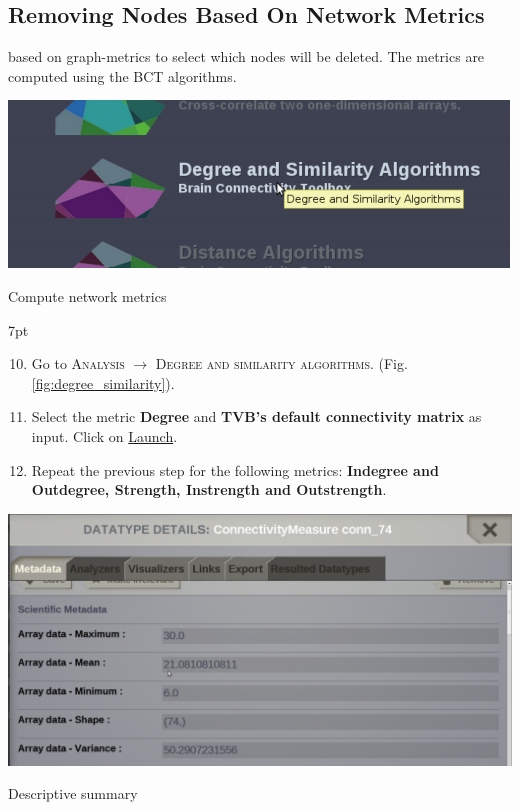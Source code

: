 \documentclass{tufte-handout}
\newenvironment{formal}{%
  \def\FrameCommand{%
    \hspace{1pt}%
    {\color{DarkBlue}\vrule width 2pt}%
    {\color{formalshade}\vrule width 4pt}%
    \colorbox{formalshade}%
  }%
  \MakeFramed{\advance\hsize-\width\FrameRestore}%
  \noindent\hspace{-4.55pt}%
  \begin{adjustwidth}{}{7pt}%
  \vspace{2pt}\vspace{2pt}%
}
{%
  \vspace{2pt}\end{adjustwidth}\endMakeFramed%
}
\begin{document}
\subsection{Removing Nodes Based On Network Metrics}\label{sec:steps}

 based on graph-metrics to select which
nodes will be deleted. The metrics are computed using the BCT  algorithms.  


\begin{marginfigure}
  \includegraphics[width=\linewidth]{Handout_UI_ModellingStructuralLesions_Analysis}%
  \caption{Compute network metrics}%
  \label{fig:degree_similarity}%
\end{marginfigure}

\begin{formal}
  \begin{enumerate}[resume]
  \setcounter{enumi}{9}
  \item Go to \textsc{Analysis} $\rightarrow$ \textsc{Degree and similarity algorithms}.  (Fig. \ref{fig:degree_similarity}).
  \item Select the metric \textbf{Degree} and \textbf{TVB's default connectivity matrix} as input. Click on \underline{Launch}.
  \item Repeat the previous step for the following metrics: \textbf{Indegree and Outdegree, Strength, Instrength and Outstrength}.
  \end{enumerate}
\end{formal}

\begin{marginfigure}
  \includegraphics[width=\linewidth]{Handout_UI_ModellingStructuralLesions_AnalysisResult}%
  \caption{Descriptive summary}%
  \label{fig:step_02}%
\end{marginfigure}
\end{document}
